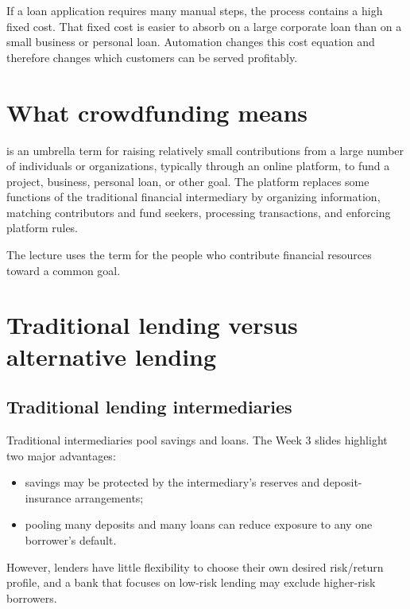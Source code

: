 \begin{intuition}
If a loan application requires many manual steps, the process contains a high fixed cost. That fixed cost is easier to absorb on a large corporate loan than on a small business or personal loan. Automation changes this cost equation and therefore changes which customers can be served profitably.
\end{intuition}

\section{What crowdfunding means}

 is an umbrella term for raising relatively small contributions from a large number of individuals or organizations, typically through an online platform, to fund a project, business, personal loan, or other goal. The platform replaces some functions of the traditional financial intermediary by organizing information, matching contributors and fund seekers, processing transactions, and enforcing platform rules.

The lecture uses the term  for the people who contribute financial resources toward a common goal.

\section{Traditional lending versus alternative lending}

\subsection{Traditional lending intermediaries}

Traditional intermediaries pool savings and loans. The Week 3 slides highlight two major advantages:

\begin{itemize}
  \item savings may be protected by the intermediary's reserves and deposit-insurance arrangements;
  \item pooling many deposits and many loans can reduce exposure to any one borrower's default.
\end{itemize}

However, lenders have little flexibility to choose their own desired risk/return profile, and a bank that focuses on low-risk lending may exclude higher-risk borrowers.

